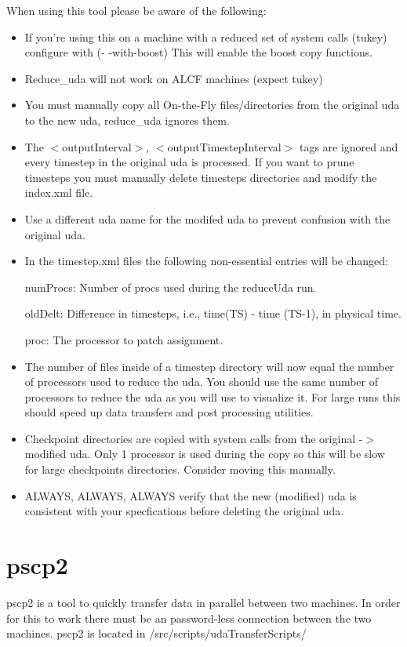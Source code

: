 When using this tool please be aware of the following:
\begin{itemize}
   \item If you're using this on a machine with a reduced set of system calls (tukey) configure with
          (- -with-boost)  This will enable the boost copy functions.
    \item Reduce\_uda will not work on ALCF machines (expect tukey)
    \item You must manually copy all On-the-Fly files/directories from the original uda
      to the new uda, reduce\_uda ignores them.
    \item The $<$outputInterval$>$, $<$outputTimestepInterval$>$ tags are ignored and every
      timestep in the original uda is processed.  If you want to prune timesteps
      you must manually delete timesteps directories and modify the index.xml file.
    \item Use a different uda name for the modifed uda to prevent confusion with the original uda.
    \item In the timestep.xml files the following non-essential entries will be changed:
    
           numProcs:      Number of procs used during the reduceUda run.
           
           oldDelt:       Difference in timesteps, i.e., time(TS) - time (TS-1), in physical time.
           
           proc:          The processor to patch assignment.
    \item The number of files inside of a timestep directory will now equal the number of processors used to reduce the uda.
        You should use the same number of processors to reduce the uda as you will use to visualize it.
         For large runs this should speed up data transfers and post processing utilities.

    \item Checkpoint directories are copied with system calls from the original -$>$ modified uda.
      Only 1 processor is used during the copy so this will be slow for large checkpoints directories.
      Consider moving this manually.
    \item ALWAYS, ALWAYS, ALWAYS verify that the new (modified) uda is consistent
      with your specfications before deleting the original uda.
 \end{itemize}

\section{pscp2}
pscp2 is a tool to quickly transfer data in parallel between two machines. In order for this to work there must be an password-less connection between the two machines. pscp2 is located in /src/scripts/udaTransferScripts/

